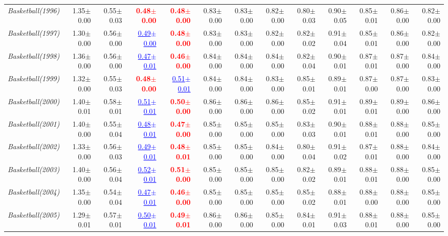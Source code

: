 \documentclass[nohyperref]{article}
\theoremstyle{plain}
\theoremstyle{definition}
\theoremstyle{remark}
\newcommand{\red}[1]{\textcolor{red}{\textbf{#1}}}
\newcommand{\blue}[1]{\textcolor{blue}{\underline{#1}}}
\begin{document}
\begin{table*}[!ht]
{\begin{tabular}{lrr|rrrrr|rrrrr}
			{\it Basketball(1996)} & 1.35$\pm$0.00 & 0.55$\pm$0.03 & \red{0.48$\pm$0.00} & \red{0.48$\pm$0.00} & 0.83$\pm$0.00 & 0.83$\pm$0.00 & 0.82$\pm$0.00 & 0.80$\pm$0.03 & 0.90$\pm$0.05 & 0.85$\pm$0.01 & 0.86$\pm$0.00 & 0.82$\pm$0.00 \\
			{\it Basketball(1997)} & 1.30$\pm$0.00 & 0.56$\pm$0.00 & \blue{0.49$\pm$0.00} & \red{0.48$\pm$0.00} & 0.83$\pm$0.00 & 0.83$\pm$0.00 & 0.82$\pm$0.00 & 0.82$\pm$0.02 & 0.91$\pm$0.04 & 0.85$\pm$0.01 & 0.86$\pm$0.00 & 0.82$\pm$0.00 \\
			{\it Basketball(1998)} & 1.36$\pm$0.00 & 0.56$\pm$0.00 & \blue{0.47$\pm$0.01} & \red{0.46$\pm$0.00} & 0.84$\pm$0.00 & 0.84$\pm$0.00 & 0.84$\pm$0.00 & 0.82$\pm$0.04 & 0.90$\pm$0.01 & 0.87$\pm$0.01 & 0.87$\pm$0.00 & 0.84$\pm$0.00 \\
			{\it Basketball(1999)} & 1.32$\pm$0.00 & 0.55$\pm$0.03 & \red{0.48$\pm$0.00} & \blue{0.51$\pm$0.01} & 0.84$\pm$0.00 & 0.84$\pm$0.00 & 0.83$\pm$0.00 & 0.85$\pm$0.01 & 0.89$\pm$0.01 & 0.87$\pm$0.00 & 0.87$\pm$0.00 & 0.83$\pm$0.00 \\
			{\it Basketball(2000)} & 1.40$\pm$0.01 & 0.58$\pm$0.01 & \blue{0.51$\pm$0.01} & \red{0.50$\pm$0.00} & 0.86$\pm$0.00 & 0.86$\pm$0.00 & 0.86$\pm$0.00 & 0.85$\pm$0.02 & 0.91$\pm$0.01 & 0.89$\pm$0.01 & 0.89$\pm$0.00 & 0.86$\pm$0.00 \\
			{\it Basketball(2001)} & 1.40$\pm$0.00 & 0.55$\pm$0.04 & \blue{0.48$\pm$0.01} & \red{0.47$\pm$0.00} & 0.85$\pm$0.00 & 0.85$\pm$0.00 & 0.85$\pm$0.00 & 0.83$\pm$0.03 & 0.90$\pm$0.01 & 0.88$\pm$0.01 & 0.88$\pm$0.00 & 0.85$\pm$0.00 \\
			{\it Basketball(2002)} & 1.33$\pm$0.00 & 0.56$\pm$0.03 & \blue{0.49$\pm$0.01} & \red{0.48$\pm$0.01} & 0.85$\pm$0.00 & 0.85$\pm$0.00 & 0.84$\pm$0.00 & 0.80$\pm$0.04 & 0.91$\pm$0.02 & 0.87$\pm$0.01 & 0.88$\pm$0.00 & 0.84$\pm$0.00 \\
			{\it Basketball(2003)} & 1.40$\pm$0.00 & 0.56$\pm$0.04 & \blue{0.52$\pm$0.01} & \red{0.51$\pm$0.00} & 0.85$\pm$0.00 & 0.85$\pm$0.00 & 0.85$\pm$0.00 & 0.82$\pm$0.02 & 0.89$\pm$0.01 & 0.88$\pm$0.01 & 0.88$\pm$0.00 & 0.85$\pm$0.00 \\
			{\it Basketball(2004)} & 1.35$\pm$0.00 & 0.54$\pm$0.04 & \blue{0.47$\pm$0.01} & \red{0.46$\pm$0.00} & 0.85$\pm$0.00 & 0.85$\pm$0.00 & 0.85$\pm$0.00 & 0.85$\pm$0.02 & 0.88$\pm$0.01 & 0.88$\pm$0.00 & 0.88$\pm$0.00 & 0.85$\pm$0.00 \\
			{\it Basketball(2005)} & 1.29$\pm$0.01 & 0.57$\pm$0.01 & \blue{0.50$\pm$0.01} & \red{0.49$\pm$0.01} & 0.86$\pm$0.00 & 0.86$\pm$0.00 & 0.85$\pm$0.00 & 0.84$\pm$0.01 & 0.91$\pm$0.03 & 0.88$\pm$0.01 & 0.88$\pm$0.00 & 0.85$\pm$0.00 \\

\end{tabular}}
\end{table*}
\end{document}
